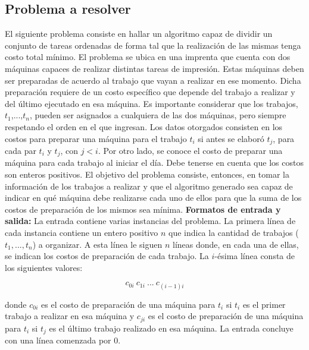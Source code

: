 \subsection{Problema a resolver}
El siguiente problema consiste en hallar un algoritmo capaz de dividir un conjunto de tareas ordenadas de forma tal que la realización de las mismas tenga costo total mínimo. El problema se ubica en una imprenta que cuenta con dos máquinas capaces de realizar distintas tareas de impresión. Estas máquinas deben ser preparadas de acuerdo al trabajo que vayan a realizar en ese momento. Dicha preparación requiere de un costo específico que depende del trabajo a realizar y del último ejecutado en esa máquina.\newline
\newline
Es importante considerar que los trabajos, $t_{1}$,...,$t_{n}$, pueden ser asignados a cualquiera de las dos máquinas, pero siempre respetando el orden en el que ingresan.\newline
\newline
Los datos otorgados consisten en los costos para preparar una máquina para el trabajo $t_{i}$ si antes se elaboró $t_{j}$, para cada par $t_{i}$ y $t_{j}$, con $j < i$. Por otro lado, se conoce el costo de preparar una máquina para cada trabajo al iniciar el día. Debe tenerse en cuenta que los costos son enteros positivos.\newline
\newline
El objetivo del problema consiste, entonces, en tomar la información de los trabajos a realizar y que el algoritmo generado sea capaz de indicar en qué máquina debe realizarse cada uno de ellos para que la suma de los costos de preparación de los mismos sea mínima.\newline
\newline
\textbf {Formatos de entrada y salida:}\newline
\newline
La entrada contiene varias instancias del problema. La primera línea de cada instancia contiene un entero positivo $n$ que indica la cantidad de trabajos ($t_{1},...,t_{n}$) a organizar. A esta línea le siguen $n$ líneas donde, en cada una de ellas, se indican los costos de preparación de cada trabajo. La $i$-ésima línea consta de los siguientes valores:

$$c_{0i}\ c_{1i}\ ...\ c_{(i-1)i}$$


donde \textbf{$c_{0i}$} es el costo de preparación de una máquina para $t_{i}$ si $t_{i}$ es el primer trabajo a realizar en esa máquina y $c_{ji}$ es el costo de preparación de una máquina para $t_{i}$ si $t_{j}$ es el último trabajo realizado en esa máquina. La entrada concluye con una línea comenzada por 0.\newline

